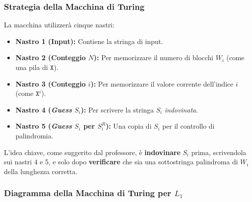 \documentclass[a4paper]{article}
\newcommand{\X}{\texttt{X}} %
\begin{document}
\subsubsection{Strategia della Macchina di Turing}
La macchina utilizzerà cinque nastri:
\begin{itemize}
    \item \textbf{Nastro 1 (Input):} Contiene la stringa di input.
    \item \textbf{Nastro 2 (Conteggio $N$):} Per memorizzare il numero di blocchi $W_i$ (come una pila di $\X$).
    \item \textbf{Nastro 3 (Conteggio $i$):} Per memorizzare il valore corrente dell'indice $i$ (come $\X^i$).
    \item \textbf{Nastro 4 (\textit{Guess} $S_i$):} Per scrivere la stringa $S_i$ \textit{indovinata}.
    \item \textbf{Nastro 5 (\textit{Guess} $S_i$ per $S_i^R$):} Una copia di $S_i$ per il controllo di palindromia.
\end{itemize}
L'idea chiave, come suggerito dal professore, è \textbf{indovinare} $S_i$ prima, scrivendola sui nastri 4 e 5, e solo dopo \textbf{verificare} che sia una sottostringa palindroma di $W_i$ della lunghezza corretta.

\subsubsection{Diagramma della Macchina di Turing per $L_1$}
\end{document}
